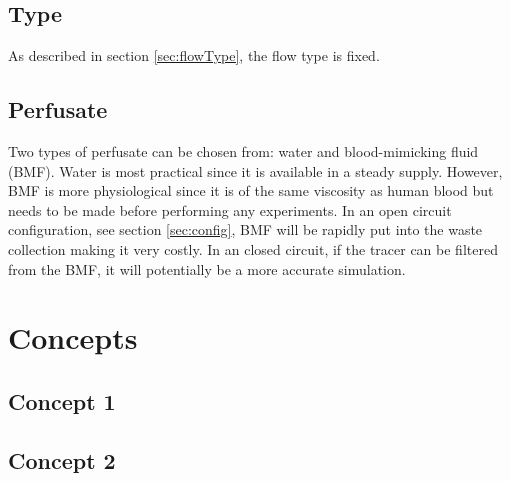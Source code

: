 \subsection*{Type}
As described in section \ref{sec:flowType}, the flow type is fixed.
\subsection*{Perfusate}
Two types of perfusate can be chosen from: water and blood-mimicking fluid (BMF). Water is most practical since it is available in a steady supply. However, BMF is more physiological since it is of the same viscosity as human blood but needs to be made before performing any experiments. In an open circuit configuration, see section \ref{sec:config}, BMF will be rapidly put into the waste collection making it very costly. In an closed circuit, if the tracer can be filtered from the BMF, it will potentially be a more accurate simulation.
\section{Concepts}
\subsection{Concept 1}
\subsection{Concept 2}
